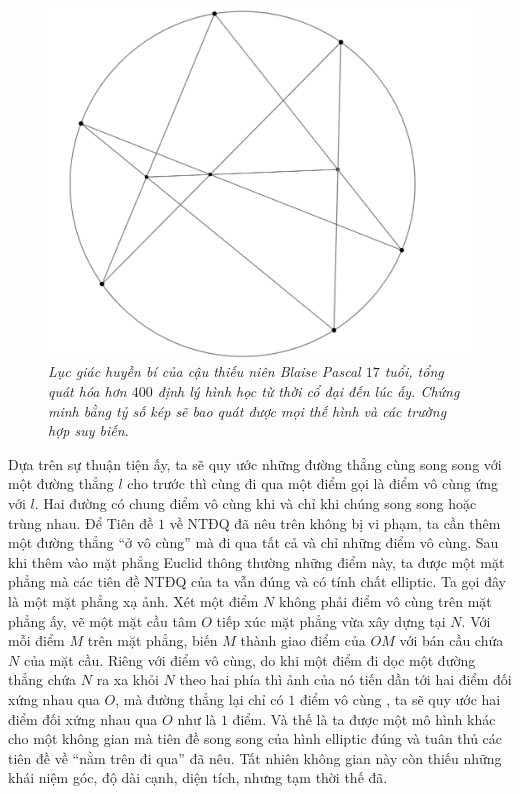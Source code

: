 \begin{multicols}{2}
	\begin{figure}[H]
		\vspace*{-5pt}
		\centering
		\captionsetup{labelformat= empty, justification=centering}
		\includegraphics[width= 1\linewidth]{Pascal_theorem.png}
		\caption{\small\textit{\color{lichsutoanhoc}Lục giác huyền bí của cậu thiếu niên Blaise Pascal $17$ tuổi, tổng quát hóa hơn $400$ định lý hình học từ thời cổ đại đến lúc ấy. Chứng minh bằng tỷ số kép sẽ bao quát được mọi thế hình và các trường hợp suy biến.}}
		\vspace*{-10pt}
	\end{figure}
	Dựa trên sự thuận tiện ấy, ta sẽ quy ước những đường thẳng cùng song song với một đường thẳng $l$ cho trước thì cùng đi qua một điểm gọi là điểm vô cùng ứng với $l$. Hai đường có chung điểm vô cùng khi và chỉ khi chúng song song hoặc trùng nhau. Để Tiên đề $1$ về NTĐQ đã nêu trên không bị vi phạm, ta cần thêm một đường thẳng ``ở vô cùng'' mà đi qua tất cả và chỉ những điểm vô cùng. Sau khi thêm vào mặt phẳng Euclid thông thường những điểm này, ta được một mặt phẳng mà các tiên đề NTĐQ của ta vẫn đúng và có tính chất elliptic. Ta gọi đây là một mặt phẳng xạ ảnh.
	\vskip 0.1cm
	Xét một điểm $N$ không phải điểm vô cùng trên mặt phẳng ấy, vẽ một mặt cầu tâm $O$ tiếp xúc mặt phẳng vừa xây dựng tại $N$. Với mỗi điểm $M$ trên mặt phẳng, biến $M$ thành giao điểm của $OM$ với bán cầu chứa $N$ của mặt cầu. Riêng với điểm vô cùng, do khi một điểm đi dọc một đường thẳng chứa $N$ ra xa khỏi $N$ theo hai phía thì ảnh của nó tiến dần tới hai điểm đối xứng nhau qua $O$, mà đường thẳng lại chỉ có $1$ điểm vô cùng , ta sẽ quy ước hai điểm đối xứng nhau qua $O$ như là $1$ điểm. Và thế là ta được một mô hình khác cho một không gian mà tiên đề song song của hình elliptic đúng và tuân thủ các tiên đề về ``nằm trên đi qua'' đã nêu. Tất nhiên không gian này còn thiếu những khái niệm góc, độ dài cạnh, diện tích, nhưng tạm thời thế đã.

\end{multicols}
